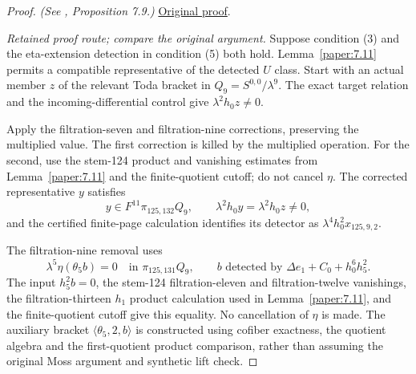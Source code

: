 \begin{proof}
\textit{(See \cite{LWX126}, Proposition 7.9.)} \href{paper/main.tex.html#L2698}{Original proof}.

\textit{Retained proof route; compare the original argument.} Suppose condition (3) and the eta-extension detection in condition (5) both hold. Lemma~\ref{paper:7.11} permits a compatible representative of the detected $U$ class. Start with an actual member $z$ of the relevant Toda bracket in $Q_9=S^{0,0}/\lambda^9$. The exact target relation and the incoming-differential control give $\lambda^2h_0z\ne0$.

Apply the filtration-seven and filtration-nine corrections, preserving the multiplied value. The first correction is killed by the multiplied operation. For the second, use the stem-124 product and vanishing estimates from Lemma~\ref{paper:7.11} and the finite-quotient cutoff; do not cancel $\eta$. The corrected representative $y$ satisfies
\[
 y\in F^{11}\pi_{125,132}Q_9,\qquad
 \lambda^2h_0y=\lambda^2h_0z\ne0,
\]
and the certified finite-page calculation identifies its detector as $\lambda^4h_0^2x_{125,9,2}$.

The filtration-nine removal uses
\[
 \lambda^5\eta(\theta_5 b)=0\quad\text{in }\pi_{125,131}Q_9,
 \qquad b\text{ detected by }\Delta e_1+C_0+h_0^6h_5^2.
\]
The input $h_5^2b=0$, the stem-124 filtration-eleven and filtration-twelve vanishings, the filtration-thirteen $h_1$ product calculation used in Lemma~\ref{paper:7.11}, and the finite-quotient cutoff give this equality. No cancellation of $\eta$ is made. The auxiliary bracket $\langle\theta_5,2,b\rangle$ is constructed using cofiber exactness, the quotient algebra and the first-quotient product comparison, rather than assuming the original Moss argument and synthetic lift check.


\end{proof}
